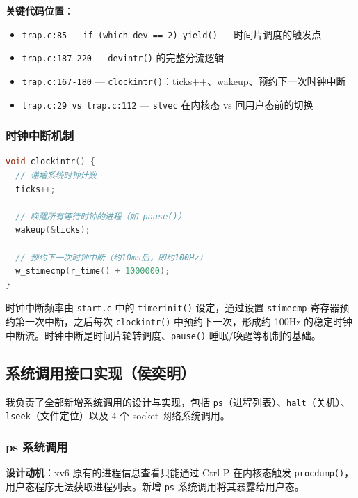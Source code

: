 \documentclass[12pt,a4paper]{ctexart}
\begin{document}
\textbf{关键代码位置}：
\begin{itemize}
  \item \texttt{trap.c:85} — \texttt{if (which\_dev == 2) yield()} — 时间片调度的触发点
  \item \texttt{trap.c:187-220} — \texttt{devintr()} 的完整分流逻辑
  \item \texttt{trap.c:167-180} — \texttt{clockintr()}：ticks++、wakeup、预约下一次时钟中断
  \item \texttt{trap.c:29 vs trap.c:112} — \texttt{stvec} 在内核态 vs 回用户态前的切换
\end{itemize}

\subsubsection{时钟中断机制}

\begin{lstlisting}[language=C, caption={clockintr() — 时钟中断处理（kernel/trap.c:167-180）}]
void clockintr() {
  // 递增系统时钟计数
  ticks++;

  // 唤醒所有等待时钟的进程（如 pause()）
  wakeup(&ticks);

  // 预约下一次时钟中断（约10ms后，即约100Hz）
  w_stimecmp(r_time() + 1000000);
}
\end{lstlisting}

时钟中断频率由 \texttt{start.c} 中的 \texttt{timerinit()} 设定，通过设置 \texttt{stimecmp} 寄存器预约第一次中断，之后每次 \texttt{clockintr()} 中预约下一次，形成约 100Hz 的稳定时钟中断流。时钟中断是时间片轮转调度、\texttt{pause()} 睡眠/唤醒等机制的基础。

\subsection{系统调用接口实现（侯奕明）}

我负责了全部新增系统调用的设计与实现，包括 \texttt{ps}（进程列表）、\texttt{halt}（关机）、\texttt{lseek}（文件定位）以及 4 个 socket 网络系统调用。

\subsubsection{ps 系统调用}

\textbf{设计动机}：xv6 原有的进程信息查看只能通过 Ctrl-P 在内核态触发 \texttt{procdump()}，用户态程序无法获取进程列表。新增 \texttt{ps} 系统调用将其暴露给用户态。
\end{document}
